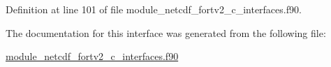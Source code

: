Definition at line 101 of file module\+\_\+netcdf\+\_\+fortv2\+\_\+c\+\_\+interfaces.\+f90.



The documentation for this interface was generated from the following file\+:\begin{DoxyCompactItemize}
\item 
\hyperlink{module__netcdf__fortv2__c__interfaces_8f90}{module\+\_\+netcdf\+\_\+fortv2\+\_\+c\+\_\+interfaces.\+f90}\end{DoxyCompactItemize}
